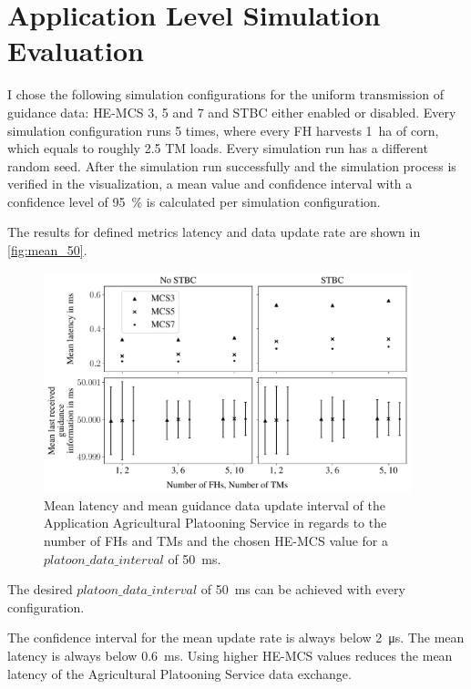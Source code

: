 \section{Application Level Simulation Evaluation}
I chose the following simulation configurations for the uniform transmission of guidance data: \ac{HE}-\ac{MCS} 3, 5 and 7 and
\ac{STBC} either enabled or disabled.
Every simulation configuration runs \num{5} times, where every \ac{FH} harvests \SI{1}{\hectare} of corn, which equals to roughly
\num{2.5} \ac{TM} loads.
Every simulation run has a different random seed.
After the simulation run successfully and the simulation process is verified in the visualization,
a mean value and confidence interval with a confidence level of
\SI{95}{\percent} is calculated per simulation configuration.

The results for defined metrics latency and data update rate are shown in \autoref{fig:mean_50}.


\begin{figure}[]%
	\centering
	\includegraphics[width=0.95\textwidth]{figures/latency_lastUpdate50ms}
	\caption{Mean latency and mean guidance data update interval of the Application Agricultural Platooning Service in regards to the number of \ac{FH}s and \ac{TM}s and
	the chosen \ac{HE}-\ac{MCS} value for a $platoon\_data\_interval$ of \SI{50}{\milli\second}.}
	\label{fig:mean_50}%
\end{figure}

The desired $platoon\_data\_interval$ of \SI{50}{\milli\second} can be achieved with every
configuration.

The confidence interval for the mean update rate is always below \SI{2}{\micro\second}.
The mean latency is always below \SI{0.6}{\milli\second}.
Using higher \ac{HE}-\ac{MCS} values reduces the mean latency of
the Agricultural Platooning Service data exchange.

